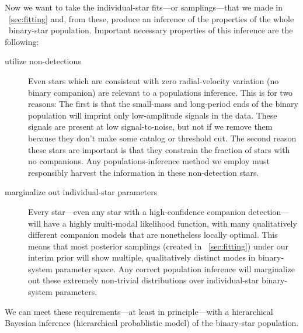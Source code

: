 \documentclass[modern, letterpaper]{aastex61}
\newcommand{\RC}{\acronym{RC}}
\begin{document}
Now we want to take the individual-star fits---or samplings---that
we made in \sectionname~\ref{sec:fitting} and, from these, produce
an inference of the properties of the whole \RC\ binary-star population.
Important necessary properties of this inference are the following:
\begin{description}
\item[utilize non-detections] Even stars which are consistent with
  zero radial-velocity variation (no binary companion) are relevant to
  a populations inference. This is for two reasons: The first is that
  the small-mass and long-period ends of the binary population will
  imprint only low-amplitude signals in the data. These signals are
  present at low signal-to-noise, but not if we remove them because
  they don't make some catalog or threshold cut. The second reason
  these stars are important is that they constrain the fraction of
  stars with no companions. Any populations-inference method we employ
  must responsibly harvest the information in these non-detection
  stars.
\item[marginalize out individual-star parameters] Every star---even
  any star with a high-confidence companion detection---will have a
  highly multi-modal likelihood function, with many qualitatively
  different companion models that are nonetheless locally
  optimal. This means that most posterior samplings (created in
  \sectionname~\ref{sec:fitting}) under our interim prior will show
  multiple, qualitatively distinct modes in binary-system parameter
  space.  Any correct population inference will marginalize out these
  extremely non-trivial distributions over individual-star
  binary-system parameters.
\end{description}
We can meet these requirements---at least in principle---with a
hierarchical Bayesian inference (hierarchical probablistic model) of
the binary-star population.
\end{document}
